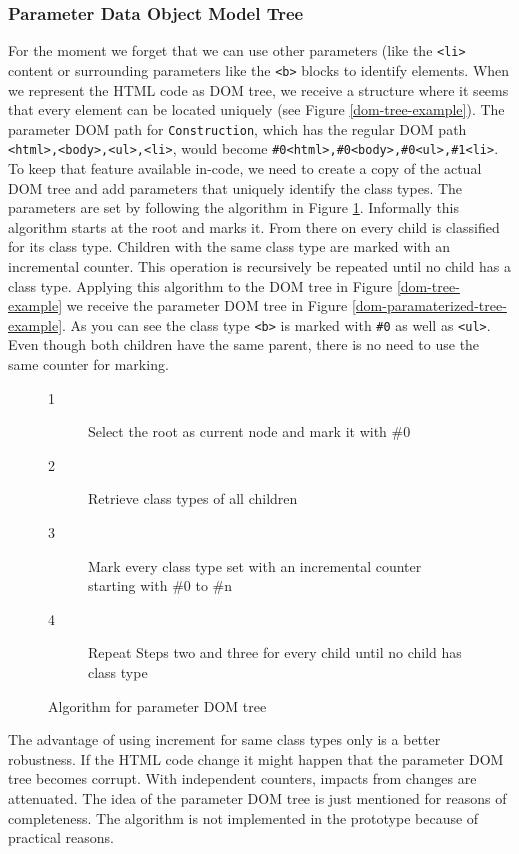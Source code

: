 \subsubsection{Parameter Data Object Model Tree}\label{param-dom-tree}

For the moment we forget that we can use other parameters (like the \verb^<li>^ content or surrounding parameters like the \verb^<b>^ blocks to identify elements. 
When we represent the HTML code as DOM tree, we receive a structure where it seems that every element can be located uniquely (see Figure \ref{dom-tree-example}). The parameter DOM path for \verb^Construction^, which has the regular DOM path \verb^<html>,<body>,<ul>,<li>^, would become \verb^#0<html>,#0<body>,#0<ul>,#1<li>^. 
To keep that feature available in-code, we need to create a copy of the actual DOM tree and add parameters that uniquely identify the class types. 
The parameters are set by following the algorithm in Figure \ref{alg-param-dom-tree}. Informally this algorithm starts at the root and marks it. From there on every child is classified for its class type. Children with the same class type are marked with an incremental counter. This operation is recursively be repeated until no child has a class type. 
Applying this algorithm to the DOM tree in Figure \ref{dom-tree-example} we receive the parameter DOM tree in Figure \ref{dom-paramaterized-tree-example}. As you can see the class type \verb^<b>^ is marked with \verb^#0^ as well as \verb^<ul>^. Even though both children have the same parent, there is no need to use the same counter for marking.

\begin{figure}
\begin{description}
	\item[1] Select the root as current node and mark it with \#0
	\item[2] Retrieve class types of all children
	\item[3] Mark every class type set with an incremental counter starting with \#0 to \#n
	\item[4] Repeat Steps two and three for every child until no child has class type
\end{description}
\caption{Algorithm for parameter DOM tree}
\label{alg-param-dom-tree}
\end{figure}

The advantage of using increment for same class types only is a better robustness. If the HTML code change it might happen that the parameter DOM tree becomes corrupt. With independent counters, impacts from changes are attenuated. 
The idea of the parameter DOM tree is just mentioned for reasons of completeness. The algorithm is not implemented in the prototype because of practical reasons. 

